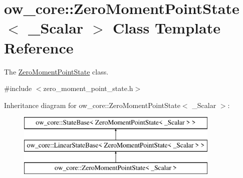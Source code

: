 \hypertarget{classow__core_1_1ZeroMomentPointState}{}\section{ow\+\_\+core\+:\+:Zero\+Moment\+Point\+State$<$ \+\_\+\+Scalar $>$ Class Template Reference}
\label{classow__core_1_1ZeroMomentPointState}


The \hyperlink{classow__core_1_1ZeroMomentPointState}{Zero\+Moment\+Point\+State} class.  




{\ttfamily \#include $<$zero\+\_\+moment\+\_\+point\+\_\+state.\+h$>$}

Inheritance diagram for ow\+\_\+core\+:\+:Zero\+Moment\+Point\+State$<$ \+\_\+\+Scalar $>$\+:\begin{figure}[H]
\begin{center}
\leavevmode
\includegraphics[height=3.000000cm]{d1/d02/classow__core_1_1ZeroMomentPointState}
\end{center}
\end{figure}
